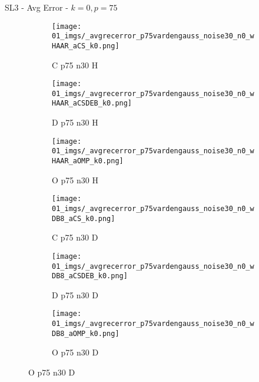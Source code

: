 \begin{frame}{SL3 - Avg Error - $k=0,p=75$}{}
\begin{figure}
\vspace{5pt}

\begin{subfigure}{0.13\textwidth}
\texttt{[image: 01\_imgs/\_avgrecerror\_p75vardengauss\_noise30\_n0\_wHAAR\_aCS\_k0.png]}
\caption*{\tiny C p75 n30 H}
\end{subfigure}
\begin{subfigure}{0.13\textwidth}
\texttt{[image: 01\_imgs/\_avgrecerror\_p75vardengauss\_noise30\_n0\_wHAAR\_aCSDEB\_k0.png]}
\caption*{\tiny D p75 n30 H}
\end{subfigure}
\begin{subfigure}{0.13\textwidth}
\texttt{[image: 01\_imgs/\_avgrecerror\_p75vardengauss\_noise30\_n0\_wHAAR\_aOMP\_k0.png]}
\caption*{\tiny O p75 n30 H}
\end{subfigure}
\begin{subfigure}{0.13\textwidth}
\texttt{[image: 01\_imgs/\_avgrecerror\_p75vardengauss\_noise30\_n0\_wDB8\_aCS\_k0.png]}
\caption*{\tiny C p75 n30 D}
\end{subfigure}
\begin{subfigure}{0.13\textwidth}
\texttt{[image: 01\_imgs/\_avgrecerror\_p75vardengauss\_noise30\_n0\_wDB8\_aCSDEB\_k0.png]}
\caption*{\tiny D p75 n30 D}
\end{subfigure}
\begin{subfigure}{0.13\textwidth}
\texttt{[image: 01\_imgs/\_avgrecerror\_p75vardengauss\_noise30\_n0\_wDB8\_aOMP\_k0.png]}
\caption*{\tiny O p75 n30 D}
\end{subfigure}
\end{figure}
\end{frame}


